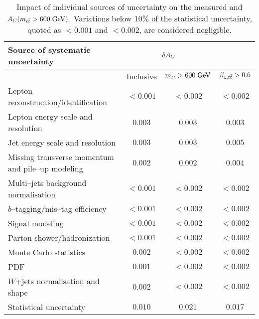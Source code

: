 \begin{table}[!htb]\centering
\begin{tabular}{l c c c}
\toprule
Source of systematic uncertainty  & \multicolumn{2}{c}{$\delta{\ensuremath{A_C}{}}$} \\
\midrule
  & Inclusive & $m_{t\bar{t}}{} >600\; \mathrm{GeV}{}$ & $\beta_{z,t\bar{t}}{}>0.6$ \\
\midrule
Lepton reconstruction/identification    & $<0.001$ & $<0.002$ & $<0.002$\\
Lepton energy scale and resolution      & $0.003$    & $0.003$   &  $0.003$\\
Jet energy scale and resolution             & $0.003$    & $0.003$   &
$0.005$ \\
Missing transverse momentum and pile--up modeling & $0.002$ & $0.002$
& $0.004$\\
Multi--jets background normalisation    & $<0.001$ & $<0.002$ & $<0.002$\\
$b$--tagging/mis--tag efficiency         & $<0.001$  & $<0.002$ & $<0.002$\\
Signal modeling                                       & $<0.001$ &
$<0.002$ & $<0.002$\\
Parton shower/hadronization             & $<0.001$  & $<0.002$ & $<0.002$\\
Monte Carlo statistics                         & $0.002$  & $<0.002$ & $<0.002$\\
PDF                                                      & $0.001$  & $<0.002$  & $<0.002$\\
$W$+jets normalisation and shape     & $0.002$  & $<0.002$ & $<0.002$\\
\midrule
Statistical uncertainty                          & $0.010$ & $0.021$ & $0.017$\\
\bottomrule
\end{tabular}
\caption{Impact of individual sources of uncertainty on the measured
  \ac{} and \mbox{$A_C{}(m_{t\bar{t}}{}>600 \; \mathrm{GeV}{})$}. Variations below $10\%$ of the
  statistical uncertainty, quoted as $<0.001$ and $<0.002$, are
  considered negligible.}
\label{tab:systematics}
\end{table}


